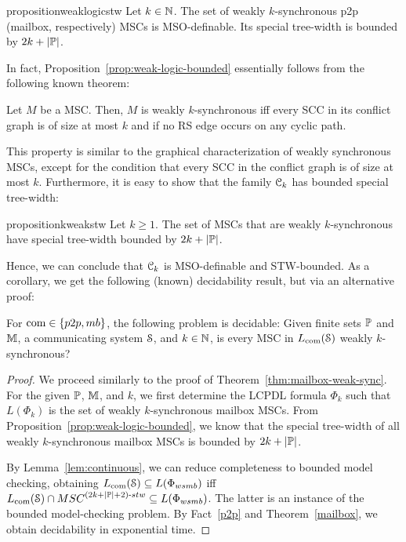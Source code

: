\documentclass[a4paper,UKenglish,cleveref, autoref, thm-restate]{lipics-v2021}
\begin{document}
\medskip


\begin{restatable}{proposition}{weaklogicstw}
	\label{prop:weak-logic-bounded}
Let $k \in \mathbb{N}$. The set of weakly $k$-synchronous p2p (mailbox, respectively) MSCs
is MSO-definable. Its special tree-width is bounded by
$2k + |\mathbb{P}|$.
\end{restatable}


In fact, Proposition~\ref{prop:weak-logic-bounded} essentially follows from the following known theorem:

\begin{theorem} \label{th:scccharactweak}
	Let $M$ be a MSC. Then, $M$ is weakly $k$-synchronous iff every SCC in its conflict graph is of size at most $k$ and if no RS edge occurs on any cyclic path.
\end{theorem}

This property is similar to the graphical characterization of weakly synchronous MSCs, except  for the condition that every SCC in the conflict graph is of size at most $k$.
Furthermore, it is easy to show that the family $\mathcal{C}_k$ has bounded special tree-width:

\begin{restatable}{proposition}{kweakstw}
\label{prop:kweakstw}
	Let $k \geq 1$. The set of MSCs that are weakly $k$-synchronous have special tree-width bounded by $2k+|\mathbb{P}|$.
\end{restatable}

Hence, we can conclude that $\mathcal{C}_k$ is MSO-definable and STW-bounded.
As a corollary, we get the following (known) decidability result, but via an alternative proof:

\begin{theorem}\label{thm:weak-sync}
For $\comsymb \in \{\ppsymb, \mbsymb\}$, the following problem is decidable:
Given finite sets $\mathbb{P}$ and $\mathbb{M}$, a communicating system $\mathcal{S}$, and $k \in \mathbb{N}$,
is every MSC in $L_{\textup{com}}(\mathcal{S})$ weakly $k$-synchronous?
\end{theorem}


\begin{proof}
We proceed similarly to the proof of Theorem~\ref{thm:mailbox-weak-sync}.
%
For the given $\mathbb{P}$, $\mathbb{M}$, and $k$, we first determine the LCPDL formula $\Phi_k$ such
that $L(\Phi_k)$ is the set of weakly $k$-synchronous mailbox MSCs. From
Proposition~\ref{prop:weak-logic-bounded}, we know that
the special tree-width of all weakly $k$-synchronous mailbox MSCs is bounded by
$2k + |\mathbb{P}|$.

By Lemma~\ref{lem:continuous}, we can reduce completeness to bounded model checking, obtaining
$\cL{\System} \subseteq L(\Phi_\mathsf{wsmb})$ iff
$\cL{\System} \cap \stwMSCs{(2k + |\Procs| + 2)} \subseteq L(\Phi_\mathsf{wsmb})$.
The latter is an instance of the bounded model-checking problem.
By Fact~\ref{p2p} and Theorem~\ref{mailbox}, we obtain decidability in exponential time.
\end{proof}
\end{document}
